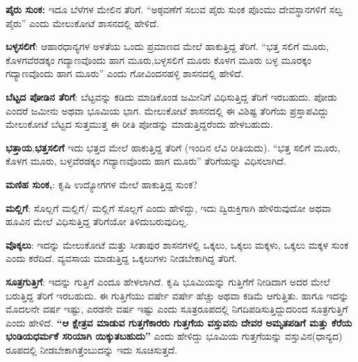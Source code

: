 \textbf{ಪೈರು ಸುಂಕ: } ಇದೂ ಬೆಳೆಗಳ ಮೇಲಿನ ತೆರಿಗೆ. “ಅಠ್ಠವಣೆಗೆ ಸಲುವ ಪೈರು ಸುಂಕ ಪೊಂಮು ದೇವಸ್ಥಾನಗಳಿಗೆ ಸಲ್ವ ಪೈರು” ಎಂದು ಮೇಲುಕೋಟೆ ಶಾಸನದಲ್ಲಿ ಹೇಳಿದೆ.

\textbf{ಬಳ್ಳಸಲಿಗೆ}: ಆಹಾರಧಾನ್ಯಗಳ ಅಳತೆಯ ಒಂದು ಪ್ರಮಾಣದ ಮೇಲೆ ಹಾಕುತ್ತಿದ್ದ ತೆರಿಗೆ. “ಭತ್ತ ಸಲಿಗೆ ಮೂರು, ಕೊಳಗವೆರಡಕ್ಕಂ ಗದ್ಯಾಣವೊಂದು ಹಾಗ ಮೂರು,ಬಳ್ಳಸಲಿಗೆ ಮೂರು ಕೊಳಗ ಮೂರು ಬಳ್ಳ ಮೂರಕ್ಕಂ ಗದ್ಯಾಣವೊಂದು ಹಾಗ ಮೂರು” ಎಂದು ಗೋವಿಂದನಹಳ್ಳಿ ಶಾಸನದಲ್ಲಿ ಹೇಳಿದೆ.

\textbf{ಬೆಟ್ಟದ ಪೋಡಿನ ತೆರಿಗೆ}: ಬೆಟ್ಟವನ್ನು ಕಡಿದು ಮಾಡಿಕೊಂಡ ಜಮೀನಿಗೆ ವಿಧಿಸುತ್ತಿದ್ದ ತೆರಿಗೆ ಇರಬಹುದು. ಪೋಡು ಎಂದರೆ ಜಮೀನು ಅಥವಾ ಭೂಮಿಯ ಭಾಗ. ಮೇಲುಕೋಟೆ ಶಾಸನದಲ್ಲಿ ಈ ವಿಶಿಷ್ಟ ತೆರಿಗೆಯ ಪ್ರಸ್ತಾಪವಿದ್ದು ಮೇಲುಕೋಟೆ ಬೆಟ್ಟದ ಸುತ್ತಮುತ್ತ ಈ ರೀತಿ ಪೋಡನ್ನು ಮಾಡುತ್ತಿದ್ದರೆಂದು ಹೇಳಬಹುದು.

\textbf{ಭತ್ತಾಯ},\textbf{ಭತ್ತಸಲಿಗೆ} ಇದು ಭತ್ತದ ಮೇಲೆ ಹಾಕುತ್ತಿದ್ದ ತೆರಿಗೆ (ಇಂದಿನ ಲೆವಿ ರೀತಿಯದು). “ಭತ್ತ ಸಲಿಗೆ ಮೂರು, ಕೊಳಗ ಮೂರು, ಬಳ್ಳವೆರಡಕ್ಕಂ ಗದ್ಯಾಣವೊಂದು ಹಾಗ ಮೂರು” ತೆರಿಗೆಯನ್ನು ವಿಧಿಸಲಾಗಿದೆ.

\textbf{ಮಣಿಹ ಸುಂಕ,}: ಕೃಷಿ ಉದ್ಯೋಗಗಳ ಮೇಲೆ ಹಾಕುತ್ತಿದ್ದ ಸುಂಕ?

\textbf{ಮಲ್ಲಿಗೆ}: ಸೊಲ್ಲಗೆ ಮಲ್ಲಿಗೆ/ ಮಲ್ಲಿಗೆ ಸೊಲ್ಲಗೆ ಎಂದು ಹೇಳಿದ್ದು, ಇದು ದ್ವಿರುಕ್ತಿಗಾಗಿ ಹೇಳಿರುವುದೋ ಅಥವಾ ಹೂವಿನ ಮೇಲೆ ವಿಧಿಸುತ್ತಿದ್ದ ತೆರಿಗೆಯೋ ತಿಳಿದುಬರುವುದಿಲ್ಲ.

\textbf{ವೊಕ್ಕಲು}: ಇದನ್ನು ಮೇಲುಕೋಟೆ ಮತ್ತು ಸೀತಾಪುರ ಶಾಸನಗಳಲ್ಲಿ ಒಕ್ಕಲು, ಒಕ್ಕಲು ಮಕ್ಕಳು, ಒಕ್ಕಲು ಮಕ್ಕಳ ಸುಂಕ ಎಂದು ಕರೆದಿದೆ. ವ್ಯವಸಾಯ ಮಾಡುತ್ತಿದ್ದ ಒಕ್ಕಲುಗಳು ನೀಡಬೇಕಾಗಿದ್ದ ತೆರಿಗೆ.

\textbf{ಸೂತ್ರಗುತ್ತಿಗೆ}: ಇದನ್ನು ಗುತ್ತಿಗೆ ಎಂದೂ ಹೇಳಲಾಗಿದೆ. ಕೃಷಿ ಭೂಮಿಯನ್ನು ಗುತ್ತಿಗೆಗೆ ನೀಡಿದಾಗ ಅದರ ಮೇಲೆ ಬರುತ್ತಿದ್ದ ತೆರಿಗೆ ಇರಬಹುದು. ಈ ಗುತ್ತಿಗೆಯು ವರ್ಷೇ ವರ್ಷೇ ಹೆಚ್ಚು ಅಥವಾ ಕಡಿಮೆ ಆಗುತ್ತಿತು. ಹಾಗೂ ಇದನ್ನು ಮೊದಲನೇ ವರ್ಷ ಇಷ್ಟು, ಎರಡನೇ ವರ್ಷ ಇಷ್ಟು ಎಂದು ಸೂತ್ರರೂಪದಲ್ಲಿ ನಿಗದಿಪಡಿಸುತ್ತಿದ್ದುದರಿಂದ ಸೂತ್ರಗುತ್ತಿಗೆ ಎಂದು ಹೇಳಿದೆ.\textbf{ “ಆ ಕ್ಷೇತ್ರವ ಮಾಡುವ ಗುತ್ತಗೆಕಾರರು ಗುತ್ತಗೆಯ ವಸ್ತುವನು ದೇವರ ಅಮೃತಪಡಿಗೆ ಮತ್ತು ಕೆರೆಯ ಭಂಡಿಯಧರ್ಮಕೆ ಸರಿಯಾಗಿ ಯಿಕ್ಕುತಬಹುದು” }ಎಂದು ಹೇಳಿದ್ದು ಭೂಮಿಯ ಗುತ್ತಗೆಯನ್ನು ವಸ್ತುವಿನ(ಧಾನ್ಯದ) ರೂಪದಲ್ಲಿ ನೀಡಬೇಕಾಗಿತ್ತೆಂಬುದನ್ನು ಇದು ಸೂಚಿಸುತ್ತದೆ.

